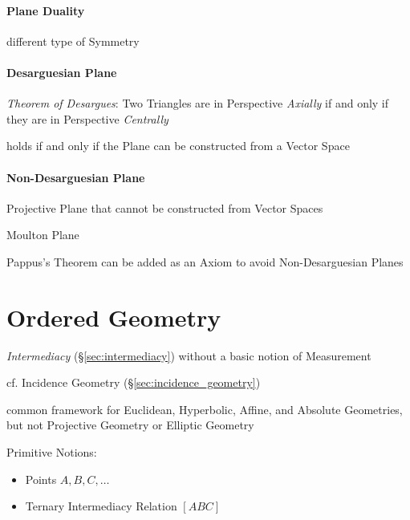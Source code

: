 \paragraph{Plane Duality}\label{sec:plane_duality}\hfill

different type of Symmetry %



\paragraph{Desarguesian Plane}\label{sec:desarguesian_plane}\hfill

\emph{Theorem of Desargues}: Two Triangles are in Perspective \emph{Axially} if
and only if they are in Perspective \emph{Centrally}

holds if and only if the Plane can be constructed from a Vector Space



\paragraph{Non-Desarguesian Plane}\label{sec:non_desarguesian}\hfill

Projective Plane that cannot be constructed from Vector Spaces

Moulton Plane

Pappus's Theorem can be added as an Axiom to avoid Non-Desarguesian Planes



\section{Ordered Geometry}\label{sec:ordered_geometry}

\emph{Intermediacy} (\S\ref{sec:intermediacy}) without a basic notion of
Measurement

\fist cf. Incidence Geometry (\S\ref{sec:incidence_geometry})

common framework for Euclidean, Hyperbolic, Affine, and Absolute Geometries, but
not Projective Geometry or Elliptic Geometry

Primitive Notions:
\begin{itemize}
  \item Points $A, B, C, \ldots$
  \item Ternary Intermediacy Relation $[ABC]$
\end{itemize}

